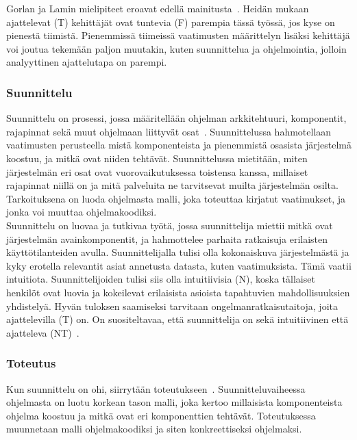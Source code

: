 \documentclass[finnish]{../tktltiki2}
\theoremstyle{definition}
\theoremstyle{remark}
\begin{document}
Gorlan ja Lamin mielipiteet eroavat edellä mainitusta~\cite{Gorla:2004:WWB:990680.990684}. Heidän mukaan ajattelevat (T) kehittäjät ovat tuntevia (F) parempia tässä työssä, jos kyse on pienestä tiimistä. Pienemmissä tiimeissä vaatimusten määrittelyn lisäksi kehittäjä voi joutua tekemään paljon muutakin, kuten suunnittelua ja ohjelmointia, jolloin analyyttinen ajattelutapa on parempi.

\subsubsection{Suunnittelu}

Suunnittelu on prosessi, jossa määritellään ohjelman arkkitehtuuri, komponentit, rajapinnat sekä muut ohjelmaan liittyvät osat~\cite{SWEBOK:409902}.
Suunnittelussa hahmotellaan vaatimusten perusteella mistä komponenteista ja pienemmistä osasista järjestelmä koostuu, ja mitkä ovat niiden tehtävät. Suunnittelussa mietitään, miten järjestelmän eri osat ovat vuorovaikutuksessa toistensa kanssa, millaiset rajapinnat niillä on ja mitä palveluita ne tarvitsevat muilta järjestelmän osilta.
Tarkoituksena on luoda ohjelmasta malli, joka toteuttaa kirjatut vaatimukset, ja jonka voi muuttaa ohjelmakoodiksi.\\

Suunnittelu on luovaa ja tutkivaa työtä, jossa suunnittelija miettii mitkä ovat järjestelmän avainkomponentit, ja hahmottelee parhaita ratkaisuja erilaisten käyttötilanteiden avulla. Suunnittelijalla tulisi olla kokonaiskuva järjestelmästä ja kyky erotella relevantit asiat annetusta datasta, kuten vaatimuksista. Tämä vaatii intuitiota.
Suunnittelijoiden tulisi siis olla intuitiivisia (N), koska tällaiset henkilöt ovat luovia ja kokeilevat erilaisista asioista tapahtuvien mahdollisuuksien yhdistelyä. Hyvän tuloksen saamiseksi tarvitaan ongelmanratkaisutaitoja, joita ajattelevilla (T) on. On suositeltavaa, että suunnittelija on sekä intuitiivinen että ajatteleva (NT)~\cite{Capretz:2010:MSS:1726559.1726574}.

\subsubsection{Toteutus}

Kun suunnittelu on ohi, siirrytään toteutukseen~\cite{SWEBOK:409902}. Suunnitteluvaiheessa ohjelmasta on luotu korkean tason malli, joka kertoo millaisista komponenteista ohjelma koostuu
ja mitkä ovat eri komponenttien tehtävät. Toteutuksessa muunnetaan malli ohjelmakoodiksi ja siten konkreettiseksi ohjelmaksi.\\
\end{document}
